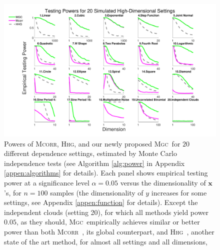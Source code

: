 \documentclass[11pt]{article}
\newcommand{\note}[2][]{\added[#1,remark={#2}]{}}
\providecommand{\sct}[1]{{\normalfont\textsc{#1}}}
\providecommand{\mb}[1]{\boldsymbol{#1}}
\newcommand{\Mgc}{\sct{Mgc}}
\newcommand{\Hhg}{\sct{Hhg}}
\newcommand{\Mcorr}{\sct{Mcorr}}
\newcommand{\cs}[1]{{\note{cs: #1}}}
\begin{document}
\begin{figure}[htbp]
\includegraphics[width=1.0\textwidth]{../Figures/FigHDPower}
\caption{Powers of \Mcorr, \Hhg, and our newly proposed \Mgc~for $20$ different dependence settings, estimated by Monte Carlo independence tests (see Algorithm \ref{alg:power} in Appendix \ref{appen:algorithms} for details).  
Each panel shows empirical testing power at a significance level $\alpha=0.05$
versus the dimensionality of $\mb{x}$'s, for $n=100$ samples (the dimensionality of $y$ increases for some settings, see Appendix \ref{appen:function} for details). 
Except the independent clouds (setting 20), for which all methods yield power $0.05$, as they should, \Mgc~empirically achieves similar or better power than both \Mcorr~\cite{SzekelyRizzo2013a}, its global counterpart, and \Hhg~\cite{HellerGorfine2013}, another state of the art method, for almost all settings and all dimensions, 
\cs{do we always use the same values for number of replicates to estimate power and scale? if so, let's just define those constants in the algorithm definition caption and not put them here. I assumed so and therefore removed them. }
}
\label{f:nD}
\end{figure}
\end{document}
